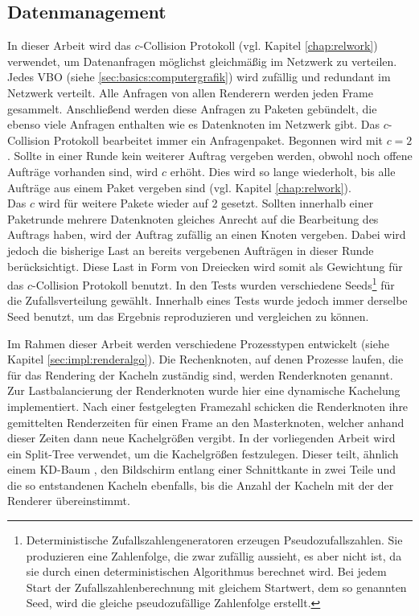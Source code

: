 \subsection{Datenmanagement}
\label{sec:basics:daten}
In dieser Arbeit wird das $c$-Collision Protokoll (vgl. Kapitel \ref{chap:relwork}) verwendet, um Datenanfragen möglichst gleichmäßig im Netzwerk zu verteilen. Jedes VBO (siehe \ref{sec:basics:computergrafik}) wird zufällig und redundant im Netzwerk verteilt. Alle Anfragen von allen Renderern werden jeden Frame gesammelt. Anschließend werden diese Anfragen zu Paketen gebündelt, die ebenso viele Anfragen enthalten wie es Datenknoten im Netzwerk gibt. Das $c$-Collision Protokoll bearbeitet immer ein Anfragenpaket. Begonnen wird mit $c = 2$. Sollte in einer Runde kein weiterer Auftrag vergeben werden, obwohl noch offene Aufträge vorhanden sind, wird $c$ erhöht. Dies wird so lange wiederholt, bis alle Aufträge aus einem Paket vergeben sind (vgl. Kapitel \ref{chap:relwork}).\\
Das $c$ wird für weitere Pakete wieder auf 2 gesetzt. Sollten innerhalb einer Paketrunde mehrere Datenknoten gleiches Anrecht auf die Bearbeitung des Auftrags haben, wird der Auftrag zufällig an einen Knoten vergeben. Dabei wird jedoch die bisherige Last an bereits vergebenen Aufträgen in dieser Runde berücksichtigt. Diese Last in Form von Dreiecken wird somit als Gewichtung für das $c$-Collision Protokoll benutzt. In den Tests wurden verschiedene Seeds\footnote{Deterministische Zufallszahlengeneratoren erzeugen Pseudozufallszahlen. Sie produzieren eine Zahlenfolge, die zwar zufällig aussieht, es aber nicht ist, da sie durch einen deterministischen Algorithmus berechnet wird. Bei jedem Start der Zufallszahlenberechnung mit gleichem Startwert, dem so genannten Seed, wird die gleiche pseudozufällige Zahlenfolge erstellt.} für die Zufallsverteilung gewählt. Innerhalb eines Tests wurde jedoch immer derselbe Seed benutzt, um das Ergebnis reproduzieren und vergleichen zu können.

\vspace{0.5cm}Im Rahmen dieser Arbeit werden verschiedene Prozesstypen entwickelt (siehe Kapitel \ref{sec:impl:renderalgo}). Die Rechenknoten, auf denen Prozesse laufen, die für das Rendering der Kacheln zuständig sind, werden Renderknoten genannt. Zur Lastbalancierung der Renderknoten wurde hier eine dynamische Kachelung implementiert. Nach einer festgelegten Framezahl schicken die Renderknoten ihre gemittelten Renderzeiten für einen Frame an den Masterknoten, welcher anhand dieser Zeiten dann neue Kachelgrößen vergibt. In der vorliegenden Arbeit wird ein Split-Tree verwendet, um die Kachelgrößen festzulegen. Dieser teilt, ähnlich einem KD-Baum \cite{RTR3}, den Bildschirm entlang einer Schnittkante in zwei Teile und die so entstandenen Kacheln ebenfalls, bis die Anzahl der Kacheln mit der der Renderer übereinstimmt. 

